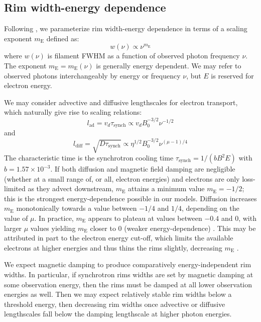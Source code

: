 \documentclass[iop, apj, numberedappendix]{emulateapj}
\newcommand*{\mt}{\mathrm}
\newcommand*{\tsynch}{\tau_{\mt{synch}}}
\newcommand*{\mE}{m_\mt{E}}
\begin{document}
\subsection{Rim width-energy dependence} \label{sec:energydep}

Following , we parameterize rim width-energy dependence
in terms of a scaling exponent $\mE$ defined as:
\begin{equation}
    w(\nu) \propto \nu^{\mE}
\end{equation}
where $w(\nu)$ is filament FWHM as a function of observed photon frequency
$\nu$.  The exponent $\mE = \mE(\nu)$ is generally energy dependent.  We may
refer to observed photons interchangeably by energy or frequency $\nu$, but $E$
is reserved for electron energy.

We may consider advective and diffusive lengthscales for electron transport,
which naturally give rise to scaling relations:
\begin{equation} \label{eq:lad}
    l_{\mt{ad}} = v_d \tsynch \propto v_d B_0^{-3/2} \nu^{-1/2}
\end{equation}
and
\begin{equation} \label{eq:ldiff}
    l_{\mt{diff}} = \sqrt{D \tsynch} \propto \eta^{1/2} B_0^{-3/2} \nu^{(\mu-1)/4}
\end{equation}
The characteristic time is the synchrotron cooling time
$\tsynch = 1 / (b B^2 E)$ with $b = 1.57 \times 10^{-3}$.
If both diffusion and magnetic field damping are negligible (whether at a small
range of, or all, electron energies) and electrons are only loss-limited as
they advect downstream, $\mE$ attains a minimum value $\mE = -1/2$; this is the
strongest energy-dependence possible in our models.  Diffusion increases $\mE$
monotonically towards a value between $-1/4$ and $1/4$, depending on the value
of $\mu$.  In practice, $\mE$ appears to plateau at values between $-0.4$ and
$0$, with larger $\mu$ values yielding $\mE$ closer to $0$ (weaker
energy-dependence) .  This may be attributed
in part to the electron energy cut-off, which limits the available electrons at
higher energies and thus thins the rims slightly, decreasing $\mE$
.

We expect magnetic damping to produce comparatively energy-independent rim
widths.  In particular, if synchrotron rims widths are set by magnetic damping
at some observation energy, then the rims must be damped at all lower
observation energies as well.  Then we may expect relatively stable rim widths
below a threshold energy, then decreasing rim widths once advective or
diffusive lengthscales fall below the damping lengthscale at higher photon
energies.
\end{document}

